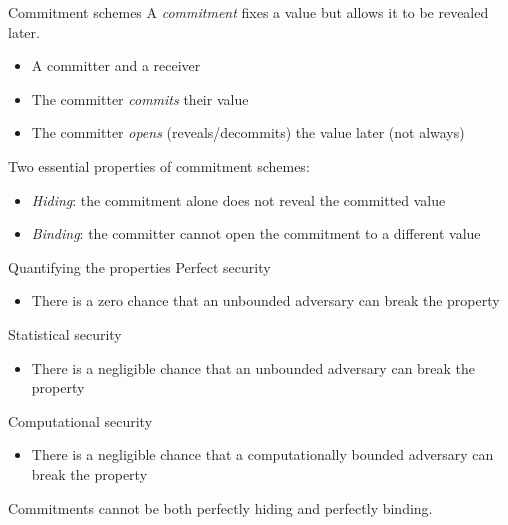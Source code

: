 \begin{frame}{Commitment schemes}
  A \emph{commitment} fixes a value but allows it to be revealed later.
  \begin{itemize}[<+(1)->]
    \item A committer and a receiver
    \item The committer \emph{commits} their value
    \item The committer \emph{opens} (reveals/decommits) the value later (not always)
  \end{itemize}

  \vspace*{1em}

  \pause
  Two essential properties of commitment schemes:
  \begin{itemize}[<+(1)->]
    \item \emph{Hiding}: the commitment alone does not reveal the committed value
    \item \emph{Binding}: the committer cannot open the commitment to a different value
  \end{itemize}
\end{frame}

\begin{frame}{Quantifying the properties}
  Perfect security
  \begin{itemize}
    \item There is a zero chance that an unbounded adversary can break the property
  \end{itemize}

  \pause
  Statistical security
  \begin{itemize}
    \item There is a negligible chance that an unbounded adversary can break the property
  \end{itemize}

  \pause
  Computational security
  \begin{itemize}
    \item There is a negligible chance that a computationally bounded adversary can break the property
  \end{itemize}

  \pause
  Commitments cannot be both perfectly hiding and perfectly binding.
\end{frame}

